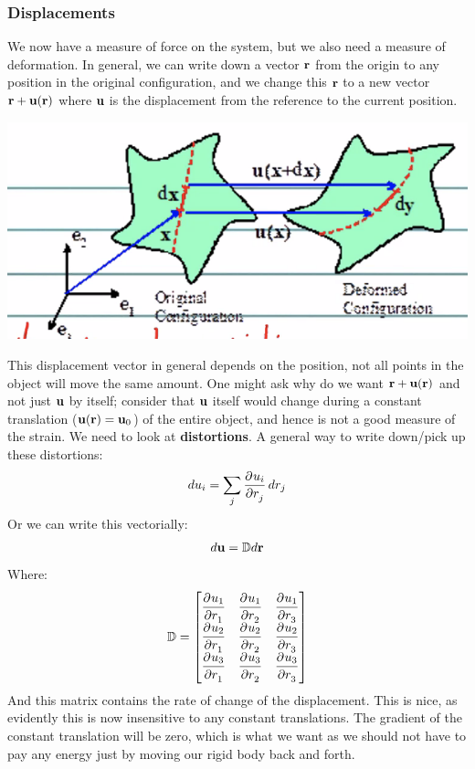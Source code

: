 \subsubsection{Displacements}
We now have a measure of force on the system, but we also need a measure of deformation. In general, we can write down a vector $\mathbf{r}$ from the origin to any position in the original configuration, and we change this $\mathbf{r}$ to a new vector $\mathbf{r} + \mathbf{u}(\mathbf{r})$ where $\mathbf{u}$ is the displacement from the reference to the current position. 
\begin{center}
    \includegraphics[scale=0.8]{Lecture-31/l31-img3.png}
\end{center}
This displacement vector in general depends on the position, not all points in the object will move the same amount. One might ask why do we want $\mathbf{r} + \mathbf{u}(\mathbf{r})$ and not just $\mathbf{u}$ by itself; consider that $\mathbf{u}$ itself would change during a constant translation ($\mathbf{u}(\mathbf{r}) = \mathbf{u}_0$) of the entire object, and hence is not a good measure of the strain. We need to look at \textbf{distortions}. A general way to write down/pick up these distortions:
\[du_i = \sum_{j}\dpd{u_i}{r_j}dr_j\]
Or we can write this vectorially:
\[d\mathbf{u} = \mathbb{D} d\mathbf{r}\]
Where:
\[\DD = \m{\dpd{u_1}{r_1} & \dpd{u_1}{r_2} & \dpd{u_1}{r_3} \\ \dpd{u_2}{r_1} & \dpd{u_2}{r_2} & \dpd{u_2}{r_3} \\
\dpd{u_3}{r_1} & \dpd{u_3}{r_2} & \dpd{u_3}{r_3}}\]
And this matrix contains the rate of change of the displacement. This is nice, as evidently this is now insensitive to any constant translations. The gradient of the constant translation will be zero, which is what we want as we should not have to pay any energy just by moving our rigid body back and forth.

